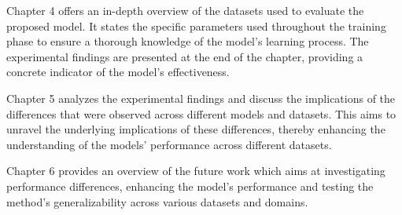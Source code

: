 Chapter 4 offers an in-depth overview of the datasets used to evaluate the proposed model. It states the specific parameters used throughout the training
phase to ensure a thorough knowledge of the model's learning process. The experimental findings are presented at the end of the chapter, providing a
concrete indicator of the model's effectiveness.


Chapter 5 analyzes the experimental findings and discuss the implications of the differences that were observed across different models and datasets. 
This aims to unravel the underlying implications of these differences, thereby enhancing the understanding of the models’ performance across different 
datasets.


Chapter 6 provides an overview of the future work which aims at investigating performance differences, enhancing the model's performance and 
testing the method’s generalizability across various datasets and domains.







